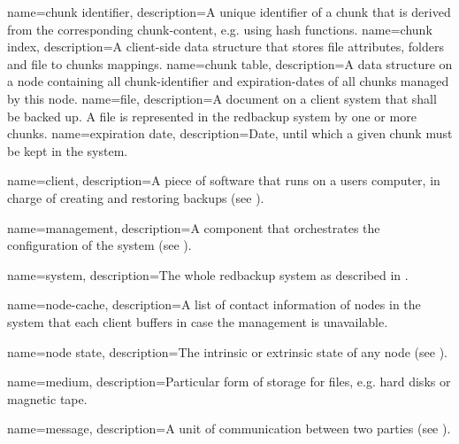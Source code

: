 {
    name={chunk identifier},
    description={A unique identifier of a \gls{chunk} that is derived from the corresponding \gls{chunk-content}, e.g. using hash functions.}
}
{
    name={chunk index},
    description={A \gls{client}-side data structure that stores file attributes, folders and file to \glspl{chunk} mappings.}
}
{
    name={chunk table},
    description={A data structure on a \gls{node} containing all \gls{chunk-identifier} and \glspl{expiration-date} of all \glspl{chunk} managed by this \gls{node}.}
}
{
    name={file},
    description={A document on a client system that shall be backed up. A file is represented in the redbackup system by one or more \glspl{chunk}.}
}
{
    name={expiration date},
    description={Date, until which a given \gls{chunk} must be kept in the system.}
}

{
    name={client},
    description={A piece of software that runs on a users computer, in charge of creating and restoring backups (see ).}
}

{
    name={management},
    description={A component that orchestrates the configuration of the system (see ).}
}

{
    name={system},
    description={The whole redbackup system as described in .}
}

{
    name={node-cache},
    description={A list of contact information of nodes in the system that each client buffers in case the management is unavailable.}
}

{
    name={node state},
    description={The intrinsic or extrinsic state of any node (see ).}
}

{
    name={medium},
    description={Particular form of storage for files, e.g. hard disks or magnetic tape.}
}

{
    name={message},
    description={A unit of communication between two parties (see ).}
}

